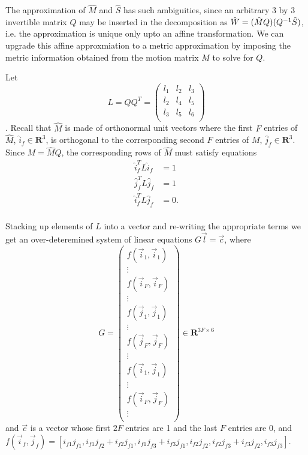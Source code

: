 The approximation of $\hat M$ and $\hat S$ has such ambiguities, since
an arbitrary 3 by 3 invertible matrix $Q$ may be inserted in the
decomposition as $\hat W = (\hat M Q) (Q^{-1} \hat S)$, i.e. the
approximation is unique only upto an affine transformation. We can
upgrade this affine approxmiation to a metric approximation by
imposing the metric information obtained from the motion matrix $M$ to
solve for $Q$.

Let $$L = QQ^T =
\begin{pmatrix}
l_1& l_2& l_3\\
l_2& l_4& l_5\\
l_3& l_5& l_6\\
\end{pmatrix}
$$. Recall that $\hat M$ is made of orthonormal unit vectors where the first
$F$ entries of $\hat M$, $\hat i_f\in \mathbf{R}^3$, is orthogonal to the corresponding second $F$
entries of $M$, $\hat j_f \in \mathbf{R}^3$. Since $M = \hat M Q$, the corresponding
rows of $\hat M$ must satisfy equations 
\begin{align*}
  \label{eq:metric}  
  \hat i_f^T L \hat i_f &= 1\\
  \hat j_f^T L \hat j_f &= 1\\
  \hat i_f^T L \hat j_f &= 0.\\
\end{align*}

Stacking up elements of $L$ into a vector and re-writing the appropriate terms
we get an over-deteremined system of linear equations $G\vec l = \vec
c$, where $$
  G = \begin{pmatrix}
    f(\vec i_1, \vec i_1) \\ \vdots \\f(\vec i_F, \vec i_F) \\ \vdots \\
    f(\vec j_1, \vec j_1) \\ \vdots \\    f(\vec j_F, \vec j_F) \\ \vdots \\
    f(\vec i_1, \vec j_1) \\ \vdots \\f(\vec i_F, \vec j_F) \\ \vdots \\
  \end{pmatrix}\in \mathbf{R}^{3F\times 6}$$
 and $\vec c$ is a vector whose first $2F$ entries are 1 and the last
 $F$ entries are 0, and $f(\vec i_f, \vec j_f) = [i_{f1}j_{f1},
 i_{f1}j_{f2}+i_{f2}j_{f1}, i_{f1}j_{f3}+i_{f3}j_{f1}, i_{f2}j_{f2},
 i_{f2}j_{f3}+i_{f3}j_{f2}, i_{f3}j_{f3}]$.

